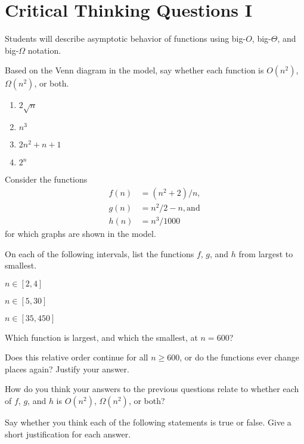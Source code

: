 \documentclass{tufte-handout}
\begin{document}
\newpage
\section{Critical Thinking Questions I}
\begin{objective}
  Students will describe asymptotic behavior of functions
  using big-$O$, big-$\Theta$, and big-$\Omega$ notation.
\end{objective}
\begin{questions}
\item Based on the Venn diagram in the model, say whether each
  function is $O(n^2)$, $\Omega(n^2)$, or both.
  \begin{enumerate}[label=(\alph*)]
    \item $2\sqrt n$
    \item $n^3$
    \item $2n^2 + n + 1$
    \item $2^n$
    \end{enumerate}
\end{questions}
Consider the functions
\begin{align*}
  f(n) &= (n^2 + 2)/n, \\ g(n) &= n^2/2 - n, \text{and} \\ h(n) &= n^3/1000
\end{align*}
for which graphs are shown in the model.
\begin{questions}
  \item On each of the following intervals, list the functions $f$,
    $g$, and $h$ from largest to smallest.
  \begin{subquestions}
  \item $n \in [2,4]$
  \item $n \in [5,30]$
  \item $n \in [35,450]$
  \end{subquestions}
\item Which function is largest, and which the smallest, at $n = 600$?
\item Does this relative order continue for all $n \geq 600$, or do
  the functions ever change places again?  Justify your answer.
  \newpage
\item How do you think your answers to the previous questions relate
  to whether each of $f$, $g$, and $h$ is $O(n^2)$, $\Omega(n^2)$, or both?
\end{questions}

\noindent Say whether you think each of the following statements is
true or false.  Give a short justification for each answer.
\end{document}
